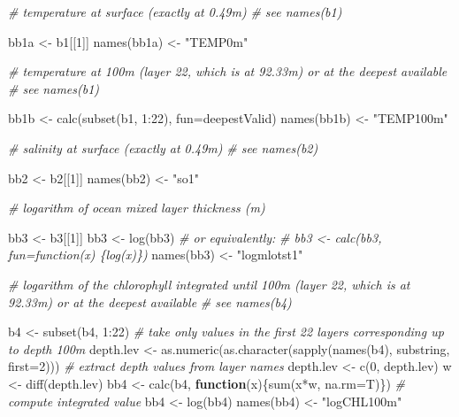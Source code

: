 \documentclass[
]{book}
\newenvironment{Shaded}{\begin{snugshade}}{\end{snugshade}}
\newcommand{\AttributeTok}[1]{\textcolor[rgb]{0.77,0.63,0.00}{#1}}
\newcommand{\CommentTok}[1]{\textcolor[rgb]{0.56,0.35,0.01}{\textit{#1}}}
\newcommand{\ControlFlowTok}[1]{\textcolor[rgb]{0.13,0.29,0.53}{\textbf{#1}}}
\newcommand{\DecValTok}[1]{\textcolor[rgb]{0.00,0.00,0.81}{#1}}
\newcommand{\FunctionTok}[1]{\textcolor[rgb]{0.00,0.00,0.00}{#1}}
\newcommand{\NormalTok}[1]{#1}
\newcommand{\OtherTok}[1]{\textcolor[rgb]{0.56,0.35,0.01}{#1}}
\newcommand{\SpecialCharTok}[1]{\textcolor[rgb]{0.00,0.00,0.00}{#1}}
\newcommand{\StringTok}[1]{\textcolor[rgb]{0.31,0.60,0.02}{#1}}
\begin{document}
\begin{Shaded}
\begin{Highlighting}[]
\CommentTok{\# temperature at surface (exactly at 0.49m)}
\CommentTok{\# see names(b1)}

\NormalTok{bb1a }\OtherTok{\textless{}{-}}\NormalTok{ b1[[}\DecValTok{1}\NormalTok{]] }
\FunctionTok{names}\NormalTok{(bb1a) }\OtherTok{\textless{}{-}} \StringTok{"TEMP0m"}  

\CommentTok{\# temperature at 100m (layer 22, which is at 92.33m) or at the deepest available }
\CommentTok{\# see names(b1)}

\NormalTok{bb1b }\OtherTok{\textless{}{-}} \FunctionTok{calc}\NormalTok{(}\FunctionTok{subset}\NormalTok{(b1, }\DecValTok{1}\SpecialCharTok{:}\DecValTok{22}\NormalTok{), }\AttributeTok{fun=}\NormalTok{deepestValid)}
\FunctionTok{names}\NormalTok{(bb1b) }\OtherTok{\textless{}{-}} \StringTok{"TEMP100m"} 

\CommentTok{\# salinity at surface (exactly at 0.49m)}
\CommentTok{\# see names(b2)}

\NormalTok{bb2 }\OtherTok{\textless{}{-}}\NormalTok{ b2[[}\DecValTok{1}\NormalTok{]] }
\FunctionTok{names}\NormalTok{(bb2) }\OtherTok{\textless{}{-}} \StringTok{"so1"}  

\CommentTok{\# logarithm of ocean mixed layer thickness (m)}

\NormalTok{bb3 }\OtherTok{\textless{}{-}}\NormalTok{ b3[[}\DecValTok{1}\NormalTok{]]}
\NormalTok{bb3 }\OtherTok{\textless{}{-}} \FunctionTok{log}\NormalTok{(bb3)}
\CommentTok{\# or equivalently:}
\CommentTok{\# bb3 \textless{}{-} calc(bb3, fun=function(x) \{log(x)\})}
\FunctionTok{names}\NormalTok{(bb3) }\OtherTok{\textless{}{-}} \StringTok{"logmlotst1"}

\CommentTok{\# logarithm of the chlorophyll integrated until 100m (layer 22, which is at 92.33m) or at the deepest available }
\CommentTok{\# see names(b4)}

\NormalTok{b4 }\OtherTok{\textless{}{-}} \FunctionTok{subset}\NormalTok{(b4, }\DecValTok{1}\SpecialCharTok{:}\DecValTok{22}\NormalTok{) }\CommentTok{\# take only values in the first 22 layers corresponding up to depth 100m }
\NormalTok{depth.lev }\OtherTok{\textless{}{-}} \FunctionTok{as.numeric}\NormalTok{(}\FunctionTok{as.character}\NormalTok{(}\FunctionTok{sapply}\NormalTok{(}\FunctionTok{names}\NormalTok{(b4), substring, }\AttributeTok{first=}\DecValTok{2}\NormalTok{))) }\CommentTok{\# extract depth values from layer names}
\NormalTok{depth.lev }\OtherTok{\textless{}{-}} \FunctionTok{c}\NormalTok{(}\DecValTok{0}\NormalTok{, depth.lev)}
\NormalTok{w }\OtherTok{\textless{}{-}} \FunctionTok{diff}\NormalTok{(depth.lev) }
\NormalTok{bb4 }\OtherTok{\textless{}{-}} \FunctionTok{calc}\NormalTok{(b4, }\ControlFlowTok{function}\NormalTok{(x)\{}\FunctionTok{sum}\NormalTok{(x}\SpecialCharTok{*}\NormalTok{w, }\AttributeTok{na.rm=}\NormalTok{T)\}) }\CommentTok{\# compute integrated value}
\NormalTok{bb4 }\OtherTok{\textless{}{-}} \FunctionTok{log}\NormalTok{(bb4)}
\FunctionTok{names}\NormalTok{(bb4) }\OtherTok{\textless{}{-}} \StringTok{"logCHL100m"}


\end{Highlighting}
\end{Shaded}
\end{document}
